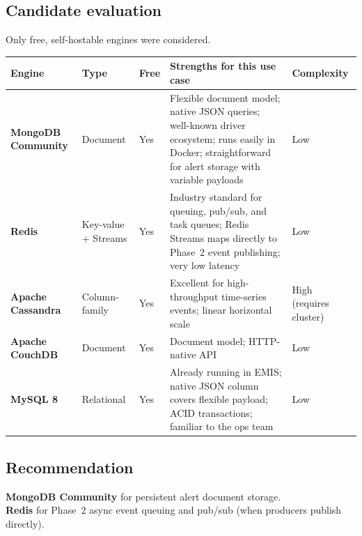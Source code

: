 \documentclass[11pt]{article}
\begin{document}
\subsection{Candidate evaluation}

Only free, self-hostable engines were considered.

\begin{table}[h]
\small
\begin{tabularx}{\textwidth}{l l l X l}
\toprule
\textbf{Engine} & \textbf{Type} & \textbf{Free} & \textbf{Strengths for this use case} & \textbf{Complexity} \\
\midrule
\textbf{MongoDB Community} & Document & Yes &
  Flexible document model; native JSON queries; well-known driver ecosystem;
  runs easily in Docker; straightforward for alert storage with variable payloads &
  Low \\[4pt]
\textbf{Redis} & Key-value + Streams & Yes &
  Industry standard for queuing, pub/sub, and task queues; Redis Streams maps
  directly to Phase~2 event publishing; very low latency &
  Low \\[4pt]
\textbf{Apache Cassandra} & Column-family & Yes &
  Excellent for high-throughput time-series events; linear horizontal scale &
  High (requires cluster) \\[4pt]
\textbf{Apache CouchDB} & Document & Yes &
  Document model; HTTP-native API &
  Low \\[4pt]
\textbf{MySQL 8} & Relational & Yes &
  Already running in EMIS; native JSON column covers flexible payload;
  ACID transactions; familiar to the ops team &
  Low \\
\bottomrule
\end{tabularx}
\end{table}

\subsection{Recommendation}

\begin{keybox}
\textbf{MongoDB Community} for persistent alert document storage. \\
\textbf{Redis} for Phase~2 async event queuing and pub/sub (when producers publish directly).
\end{keybox}
\end{document}
